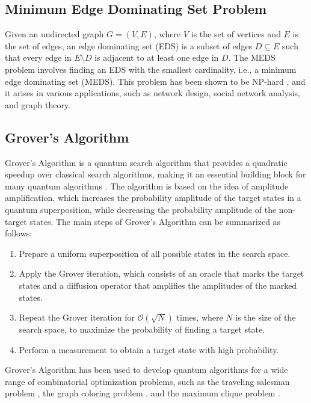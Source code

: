 \subsection{Minimum Edge Dominating Set Problem}\label{subsec:meds_problem}

Given an undirected graph $G = (V, E)$, where $V$ is the set of vertices and $E$ is the set of edges, an edge dominating set (EDS) is a subset of edges $D \subseteq E$ such that every edge in $E \setminus D$ is adjacent to at least one edge in $D$. The MEDS problem involves finding an EDS with the smallest cardinality, i.e., a minimum edge dominating set (MEDS). This problem has been shown to be NP-hard \cite{garey1979computers}, and it arises in various applications, such as network design, social network analysis, and graph theory.

\subsection{Grover's Algorithm}\label{subsec:grover_algorithm}

Grover's Algorithm is a quantum search algorithm that provides a quadratic speedup over classical search algorithms, making it an essential building block for many quantum algorithms \cite{grover1996fast}. The algorithm is based on the idea of amplitude amplification, which increases the probability amplitude of the target states in a quantum superposition, while decreasing the probability amplitude of the non-target states. The main steps of Grover's Algorithm can be summarized as follows:

\begin{enumerate}
    \item Prepare a uniform superposition of all possible states in the search space.
    \item Apply the Grover iteration, which consists of an oracle that marks the target states and a diffusion operator that amplifies the amplitudes of the marked states.
    \item Repeat the Grover iteration for $\mathcal{O}(\sqrt{N})$ times, where $N$ is the size of the search space, to maximize the probability of finding a target state.
    \item Perform a measurement to obtain a target state with high probability.
\end{enumerate}

Grover's Algorithm has been used to develop quantum algorithms for a wide range of combinatorial optimization problems, such as the traveling salesman problem \cite{zalka1999grover}, the graph coloring problem \cite{childs2000quantum}, and the maximum clique problem \cite{dridi2017approximate}.

